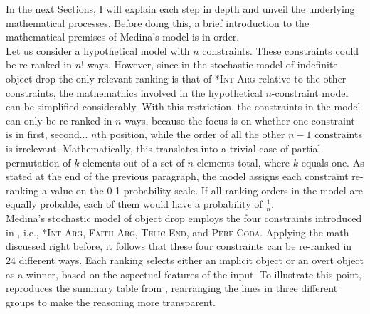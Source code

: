 In the next Sections, I will explain each step in depth and unveil the underlying mathematical processes. Before doing this, a brief introduction to the mathematical premises of Medina's model is in order.\\
Let us consider a hypothetical model with $n$ constraints. These constraints could be re-ranked in $n!$ ways. However, since in the stochastic model of indefinite object drop the only relevant ranking is that of \textsc{*Int Arg} relative to the other constraints, the mathemathics involved in the hypothetical $n$-constraint model can be simplified considerably. With this restriction, the constraints in the model can only be re-ranked in $n$ ways, because the focus is on whether one constraint is in first, second... $n$th position, while the order of all the other $n-1$ constraints is irrelevant. Mathematically, this translates into a trivial case of partial permutation of $k$ elements out of a set of $n$ elements total, where $k$ equals one. As stated at the end of the previous paragraph, the model assigns each constraint re-ranking a value on the 0-1 probability scale. If all ranking orders in the model are equally probable, each of them would have a probability of $\frac{1}{n}$.\\
Medina's stochastic model of object drop employs the four constraints introduced in , i.e., \textsc{*Int Arg}, \textsc{Faith Arg}, \textsc{Telic End}, and \textsc{Perf Coda}. Applying the math discussed right before, it follows that these four constraints can be re-ranked in 24 different ways. Each ranking selects either an implicit object or an overt object as a winner, based on the aspectual features of the input. To illustrate this point,  reproduces the summary table from \textcite[89]{Medina2007}, rearranging the lines in three different groups to make the reasoning more transparent.

